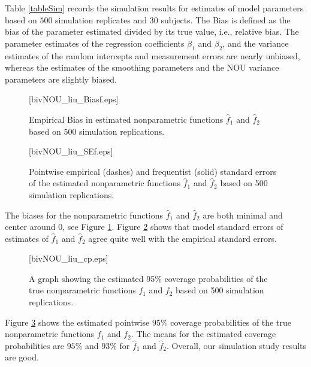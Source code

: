 \documentclass[article,lineno]{biometrika}
\begin{document}
Table \ref{tableSim} records the simulation results for estimates of model parameters based on $500$ simulation replicates and $30$ subjects. The Bias is defined as the bias of the parameter estimated divided by its true value, i.e., relative bias. 
The parameter estimates of the regression coefficients $\beta_1$ and $\beta_2$, and the variance estimates of the random intercepts and measurement errors are nearly unbiased, whereas the estimates of the smoothing parameters and the NOU variance parameters are slightly biased. 

\begin{figure}
\figurebox{20pc}{25pc}{}[bivNOU_liu_Biasf.eps]
\caption{Empirical Bias in estimated nonparametric functions $\hat f_1$ and $\hat f_2$ based on 500 simulation replications.}
\label{Biasf}
\end{figure}

\begin{figure}
\figurebox{20pc}{25pc}{}[bivNOU_liu_SEf.eps]
\caption{Pointwise empirical (dashes) and frequentist (solid) standard errors of the estimated nonparametric functions $\hat f_1$ and $\hat f_2$ based on 500 simulation replications.}
\label{SEf}
\end{figure}

The biases for the nonparametric functions  $\hat f_1$ and $\hat f_2$ are both minimal and center around $0$, see Figure \ref{Biasf}. Figure \ref{SEf} shows that model standard errors of estimates of $\hat f_1$ and $\hat f_2$ agree quite well with the empirical standard errors. 

\begin{figure}
\figurebox{20pc}{25pc}{}[bivNOU_liu_cp.eps]
\caption{A graph showing the estimated 95\% coverage probabilities of the true nonparametric functions $f_1$ and $f_2$ based on 500 simulation replications.}
\label{cp}
\end{figure}

Figure \ref{cp} shows the estimated pointwise $95\%$ coverage probabilities of the true nonparametric functions $f_1$ and $f_2$. The means for the estimated coverage probabilities are $95\%$ and $93\%$ for  $\hat f_1$ and $\hat f_2$. Overall, our simulation study results are good.
\end{document}

